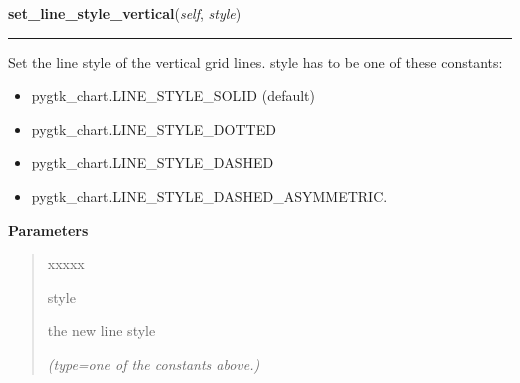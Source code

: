 \hspace{.8\funcindent}\begin{boxedminipage}{\funcwidth}

    \raggedright \textbf{set\_line\_style\_vertical}(\textit{self}, \textit{style})

    \vspace{-1.5ex}

    \rule{\textwidth}{0.5\fboxrule}
\setlength{\parskip}{2ex}
    Set the line style of the vertical grid lines. style has to be one of 
    these constants:

    \begin{itemize}
    \setlength{\parskip}{0.6ex}
      \item pygtk\_chart.LINE\_STYLE\_SOLID (default)

      \item pygtk\_chart.LINE\_STYLE\_DOTTED

      \item pygtk\_chart.LINE\_STYLE\_DASHED

      \item pygtk\_chart.LINE\_STYLE\_DASHED\_ASYMMETRIC.

    \end{itemize}

\setlength{\parskip}{1ex}
      \textbf{Parameters}
      \vspace{-1ex}

      \begin{quote}
        \begin{Ventry}{xxxxx}

          \item[style]

          the new line style

            {\it (type=one of the constants above.)}

        \end{Ventry}

      \end{quote}

    \end{boxedminipage}

    \label{pygtk_chart:line_chart:Grid:get_line_style_vertical}

    \vspace{0.5ex}

